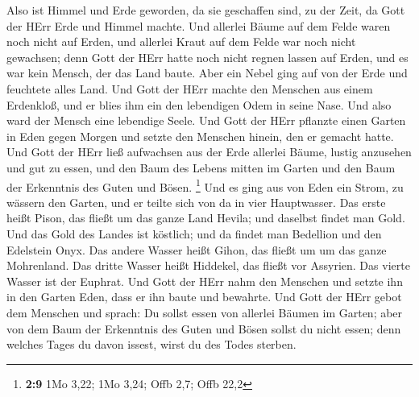  Also ist Himmel und Erde geworden, da sie geschaffen sind,
zu der Zeit, da Gott der HErr Erde und Himmel machte.  Und
allerlei Bäume auf dem Felde waren noch nicht auf Erden, und allerlei
Kraut auf dem Felde war noch nicht gewachsen; denn Gott der HErr hatte
noch nicht regnen lassen auf Erden, und es war kein Mensch, der das Land
baute.  Aber ein Nebel ging auf von der Erde und feuchtete
alles Land.  Und Gott der HErr machte den Menschen aus einem
Erdenkloß, und er blies ihm ein den lebendigen Odem in seine Nase. Und
also ward der Mensch eine lebendige Seele.  Und Gott der
HErr pflanzte einen Garten in Eden gegen Morgen und setzte den Menschen
hinein, den er gemacht hatte.  Und Gott der HErr ließ
aufwachsen aus der Erde allerlei Bäume, lustig anzusehen und gut zu
essen, und den Baum des Lebens mitten im Garten und den Baum der
Erkenntnis des Guten und Bösen. \footnote{\textbf{2:9} 1Mo 3,22; 1Mo
  3,24; Offb 2,7; Offb 22,2}  Und es ging aus von Eden ein
Strom, zu wässern den Garten, und er teilte sich von da in vier
Hauptwasser.  Das erste heißt Pison, das fließt um das
ganze Land Hevila; und daselbst findet man Gold.  Und das
Gold des Landes ist köstlich; und da findet man Bedellion und den
Edelstein Onyx.  Das andere Wasser heißt Gihon, das fließt
um um das ganze Mohrenland.  Das dritte Wasser heißt
Hiddekel, das fließt vor Assyrien. Das vierte Wasser ist der Euphrat.
 Und Gott der HErr nahm den Menschen und setzte ihn in den
Garten Eden, dass er ihn baute und bewahrte.  Und Gott der
HErr gebot dem Menschen und sprach: Du sollst essen von allerlei Bäumen
im Garten;  aber von dem Baum der Erkenntnis des Guten und
Bösen sollst du nicht essen; denn welches Tages du davon issest, wirst
du des Todes sterben.

